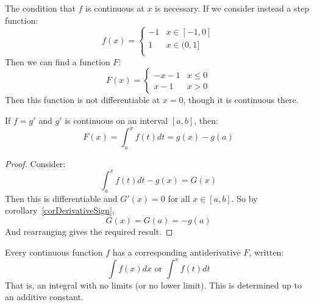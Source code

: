 \documentclass[../Main.tex]{subfiles}
\begin{document}
\begin{remark}
    The condition that $f$ is continuous at $x$ is necessary. If we consider instead a step function:
    \begin{equation*}
        f(x) = 
        \begin{cases}
            -1 & x \in [-1, 0] \\
            1 & x \in (0, 1] \\
        \end{cases}
    \end{equation*}
    Then we can find a function $F$:
    \begin{equation*}
        F(x) =
        \begin{cases}
            -x - 1 & x \leq 0 \\
            x - 1 & x > 0
        \end{cases}
    \end{equation*}
    Then this function is not differentiable at $x = 0$, though it is continuous there.
\end{remark}
\begin{corollary}
    If $f = g'$ and $g'$ is continuous on an interval $[a, b]$, then:
    \begin{equation*}
        F(x) = \int_a^x f(t) dt = g(x) - g(a)
    \end{equation*}
    \label{corIntegrationInverseDifferentiation}
\end{corollary}
\begin{proof}
    Consider:
    \begin{equation*}
        \int_a^x f(t) dt - g(x) = G(x)
    \end{equation*}
    Then this is differentiable and $G'(x) = 0$ for all $x \in [a, b]$. So by corollary~\ref{corDerivativeSign},
    \begin{equation*}
        G(x) = G(a) = -g(a)
    \end{equation*}
    And rearranging gives the required result.
\end{proof}
\begin{corollary}
    Every continuous function $f$ has a corresponding antiderivative $F$, written:
    \begin{equation*}
        \int f(x) dx \text{ or } \int^x f(t) dt
    \end{equation*}
    That is, an integral with no limits (or no lower limit). This is determined up to an additive constant.
\end{corollary}
\end{document}
